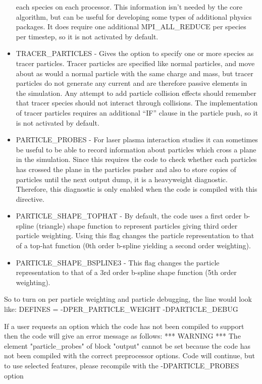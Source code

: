 \documentclass[12pt,a4paper]{article}
\newenvironment{boxverbatim}{\lboxverbatim{none}}{\endlboxverbatim}
\begin{document}
\begin{itemize}
  each species on each processor. This information isn't needed by the core
  algorithm, but can be useful for developing some types of additional physics
  packages. It does require one additional MPI\_ALL\_REDUCE per species per
  timestep, so it is not activated by default.
\item TRACER\_PARTICLES - Gives the option to specify one or more species as
  tracer particles. Tracer particles are specified like normal particles, and
  move about as would a normal particle with the same charge and mass, but
  tracer particles do not generate any current and are therefore passive
  elements in the simulation. Any attempt to add particle collision effects
  should remember that tracer species should not interact through collisions.
  The implementation of tracer particles requires an additional ``IF'' clause
  in the particle push, so it is not activated by default.
\item PARTICLE\_PROBES - For laser plasma interaction studies it can sometimes
  be useful to be able to record information about particles which cross a
  plane in the simulation. Since this requires the code to check whether each
  particles has crossed the plane in the particles pusher and also to store
  copies of particles until the next output dump, it is a heavyweight
  diagnostic. Therefore, this diagnostic is only enabled when the code is
  compiled with this directive.
\item PARTICLE\_SHAPE\_TOPHAT - By default, the code uses a first order
  b-spline (triangle) shape function to represent particles giving
  third order particle weighting.
  Using this flag changes the particle representation to that of a top-hat
  function (0th order b-spline yielding a second order weighting).
\item PARTICLE\_SHAPE\_BSPLINE3 - This flag changes the particle representation
  to that of a 3rd order b-spline shape function (5th order weighting).
\end{itemize}

So to turn on per particle weighting and particle debugging, the line would
look like:
\begin{boxverbatim}
DEFINES = -DPER_PARTICLE_WEIGHT -DPARTICLE_DEBUG
\end{boxverbatim}

If a user requests an option which the code has not been compiled to support
then the code will give an error message as follows:
\begin{boxverbatim}
 *** WARNING ***
 The element "particle_probes" of block "output" cannot be set
 because the code has not been compiled with the correct preprocessor options.
 Code will continue, but to use selected features, please recompile with the
 -DPARTICLE_PROBES option
\end{boxverbatim}
\end{document}
